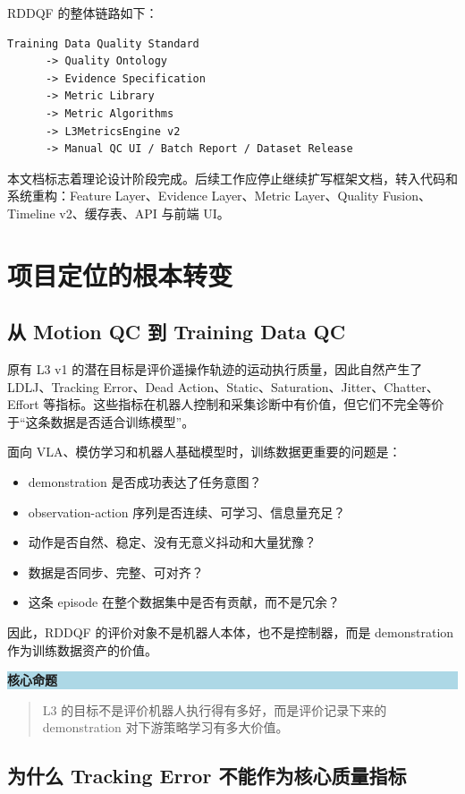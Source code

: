 \documentclass[UTF8,zihao=-4]{ctexart}
\newenvironment{notebox}[1]{\vspace{0.5em}\noindent\colorbox{LightBlue}{\parbox{0.96\linewidth}{\textbf{#1}}}\par\vspace{-0.2em}\begin{quote}\small}{\end{quote}\vspace{0.3em}}
\begin{document}
RDDQF 的整体链路如下：

\begin{verbatim}
Training Data Quality Standard
      -> Quality Ontology
      -> Evidence Specification
      -> Metric Library
      -> Metric Algorithms
      -> L3MetricsEngine v2
      -> Manual QC UI / Batch Report / Dataset Release
\end{verbatim}

本文档标志着理论设计阶段完成。后续工作应停止继续扩写框架文档，转入代码和系统重构：Feature Layer、Evidence Layer、Metric Layer、Quality Fusion、Timeline v2、缓存表、API 与前端 UI。

\section{项目定位的根本转变}

\subsection{从 Motion QC 到 Training Data QC}

原有 L3 v1 的潜在目标是评价遥操作轨迹的运动执行质量，因此自然产生了 LDLJ、Tracking Error、Dead Action、Static、Saturation、Jitter、Chatter、Effort 等指标。这些指标在机器人控制和采集诊断中有价值，但它们不完全等价于“这条数据是否适合训练模型”。

面向 VLA、模仿学习和机器人基础模型时，训练数据更重要的问题是：

\begin{itemize}
\item demonstration 是否成功表达了任务意图？
\item observation-action 序列是否连续、可学习、信息量充足？
\item 动作是否自然、稳定、没有无意义抖动和大量犹豫？
\item 数据是否同步、完整、可对齐？
\item 这条 episode 在整个数据集中是否有贡献，而不是冗余？
\end{itemize}

因此，RDDQF 的评价对象不是机器人本体，也不是控制器，而是 demonstration 作为训练数据资产的价值。

\begin{notebox}{核心命题}
L3 的目标不是评价机器人执行得有多好，而是评价记录下来的 demonstration 对下游策略学习有多大价值。
\end{notebox}

\subsection{为什么 Tracking Error 不能作为核心质量指标}
\end{document}
